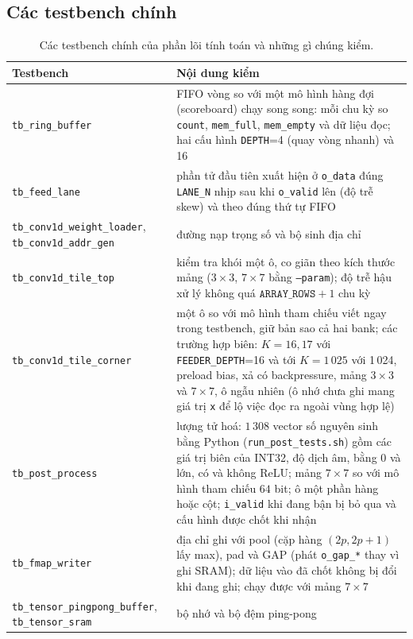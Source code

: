 \subsection{Các testbench chính}
\begin{table}[htbp]\centering
\caption{Các testbench chính của phần lõi tính toán và những gì chúng kiểm.}\label{tab:tb}
\footnotesize\setlength{\tabcolsep}{4pt}
\begin{tabular}{@{}>{\raggedright\arraybackslash}p{4.4cm}>{\raggedright\arraybackslash}p{10.7cm}@{}}
\toprule
Testbench & Nội dung kiểm \\ \midrule
\texttt{tb\_ring\_buffer} & FIFO vòng so với một mô hình hàng đợi (scoreboard) chạy song song: mỗi chu kỳ so \texttt{count}, \texttt{mem\_full}, \texttt{mem\_empty} và dữ liệu đọc; hai cấu hình \texttt{DEPTH}=4 (quay vòng nhanh) và 16 \\
\texttt{tb\_feed\_lane} & phần tử đầu tiên xuất hiện ở \texttt{o\_data} đúng \texttt{LANE\_N} nhịp sau khi \texttt{o\_valid} lên (độ trễ skew) và theo đúng thứ tự FIFO \\
\texttt{tb\_conv1d\_weight\_loader}, \texttt{tb\_conv1d\_addr\_gen} & đường nạp trọng số và bộ sinh địa chỉ \\
\texttt{tb\_conv1d\_tile\_top} & kiểm tra khói một ô, co giãn theo kích thước mảng ($3\times3$, $7\times7$ bằng \texttt{--param}); độ trễ hậu xử lý không quá $\texttt{ARRAY\_ROWS}+1$ chu kỳ \\
\texttt{tb\_conv1d\_tile\_corner} & một ô so với mô hình tham chiếu viết ngay trong testbench, giữ bản sao cả hai bank; các trường hợp biên: $K=16,17$ với \texttt{FEEDER\_DEPTH}=16 và tới $K=1\,025$ với 1\,024, preload bias, xả có backpressure, mảng $3\times3$ và $7\times7$, ô ngẫu nhiên (ô nhớ chưa ghi mang giá trị \texttt{x} để lộ việc đọc ra ngoài vùng hợp lệ) \\
\texttt{tb\_post\_process} & lượng tử hoá: $1\,308$ vector số nguyên sinh bằng Python (\texttt{run\_post\_tests.sh}) gồm các giá trị biên của INT32, độ dịch âm, bằng $0$ và lớn, có và không ReLU; mảng $7\times7$ so với mô hình tham chiếu $64$ bit; ô một phần hàng hoặc cột; \texttt{i\_valid} khi đang bận bị bỏ qua và cấu hình được chốt khi nhận \\
\texttt{tb\_fmap\_writer} & địa chỉ ghi với pool (cặp hàng $(2p,2p+1)$ lấy max), pad và GAP (phát \texttt{o\_gap\_*} thay vì ghi SRAM); dữ liệu vào đã chốt không bị đổi khi đang ghi; chạy được với mảng $7\times7$ \\
\texttt{tb\_tensor\_pingpong\_buffer}, \texttt{tb\_tensor\_sram} & bộ nhớ và bộ đệm ping-pong \\

\end{tabular}
\end{table}
